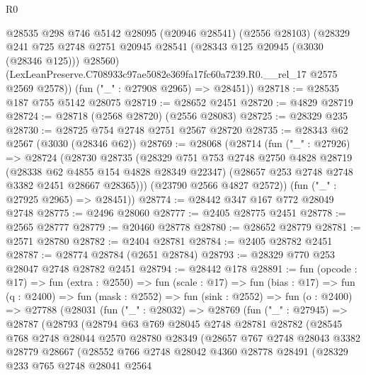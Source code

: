 \begin{lexlean}{R0}
\begin{coremodule}
      @28535
        @298
        @746
        @5142
        @28095
        (@20946 @28541)
        (@2556 @28103)
        (@28329
          @241
          @725
          @2748
          @2751
          @20945
          @28541
          (@28343 @125 @20945 (@3030 (@28346 @125)))
          @28560)
        (LexLeanPreserve.C708933c97ae5082e369fa17fc60a7239.R0.__rel_17 @2575 @2569 @2578))
      (fun ("_" : @27908 @2965) => @28451))
@28718 := @28535 @187 @755 @5142 @28075
@28719 := @28652 @2451
@28720 := @4829 @28719
@28724 := @28718 (@2568 @28720) (@2556 @28083)
@28725 := @28329 @235
@28730 := @28725 @754 @2748 @2751 @2567 @28720
@28735 := @28343 @62 @2567 (@3030 (@28346 @62))
@28769 := @28068
    (@28714
      (fun ("_" : @27926) =>
      @28724
        (@28730
          @28735
          (@28329
            @751
            @753
            @2748
            @2750
            @4828
            @28719
            (@28338 @62 @4855 @154 @4828 @28349 @22347)
            (@28657 @253 @2748 @2748 @3382 @2451 @28667 @28365)))
        (@23790 @2566 @4827 @2572))
      (fun ("_" : @27925 @2965) => @28451))
@28774 := @28442 @347 @167 @772 @28049 @2748
@28775 := @2496 @28060
@28777 := @2405 @28775 @2451
@28778 := @2565 @28777
@28779 := @20460 @28778
@28780 := @28652 @28779
@28781 := @2571 @28780
@28782 := @2404 @28781
@28784 := @2405 @28782 @2451
@28787 := @28774 @28784 (@2651 @28784)
@28793 := @28329 @770 @253 @28047 @2748 @28782 @2451
@28794 := @28442 @178
@28891 := fun (opcode : @17) =>
  fun (extra : @2550) =>
  fun (scale : @17) =>
  fun (bias : @17) =>
  fun (q : @2400) =>
  fun (mask : @2552) =>
  fun (sink : @2552) =>
  fun (o : @2400) =>
  @27788
    (@28031
      (fun ("_" : @28032) =>
      @28769
        (fun ("_" : @27945) =>
        @28787
          (@28793
            (@28794
              @63
              @769
              @28045
              @2748
              @28781
              @28782
              (@28545
                @768
                @2748
                @28044
                @2570
                @28780
                @28349
                (@28657
                  @767
                  @2748
                  @28043
                  @3382
                  @28779
                  @28667
                  (@28552
                    @766
                    @2748
                    @28042
                    @4360
                    @28778
                    @28491
                    (@28329
                      @233
                      @765
                      @2748
                      @28041
                      @2564

\end{coremodule}
\end{lexlean}
